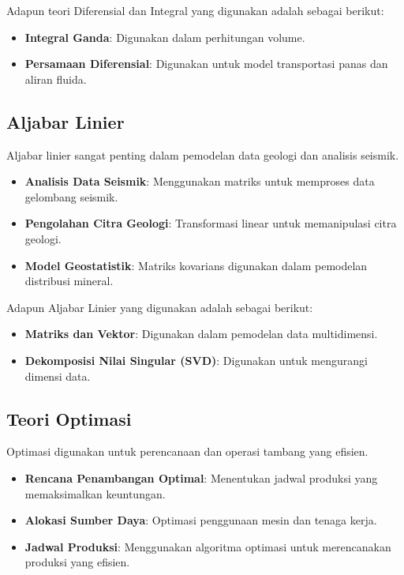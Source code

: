 \documentclass[
]{book}
\providecommand{\tightlist}{%
  \setlength{\itemsep}{0pt}\setlength{\parskip}{0pt}}
\begin{document}
Adapun teori Diferensial dan Integral yang digunakan adalah sebagai berikut:

\begin{itemize}
\tightlist
\item
  \textbf{Integral Ganda}: Digunakan dalam perhitungan volume.
\item
  \textbf{Persamaan Diferensial}: Digunakan untuk model transportasi panas dan aliran fluida.
\end{itemize}

\subsection{Aljabar Linier}\label{aljabar-linier}

Aljabar linier sangat penting dalam pemodelan data geologi dan analisis seismik.

\begin{itemize}
\tightlist
\item
  \textbf{Analisis Data Seismik}: Menggunakan matriks untuk memproses data gelombang seismik.
\item
  \textbf{Pengolahan Citra Geologi}: Transformasi linear untuk memanipulasi citra geologi.
\item
  \textbf{Model Geostatistik}: Matriks kovarians digunakan dalam pemodelan distribusi mineral.
\end{itemize}

Adapun Aljabar Linier yang digunakan adalah sebagai berikut:

\begin{itemize}
\tightlist
\item
  \textbf{Matriks dan Vektor}: Digunakan dalam pemodelan data multidimensi.
\item
  \textbf{Dekomposisi Nilai Singular (SVD)}: Digunakan untuk mengurangi dimensi data.
\end{itemize}

\subsection{Teori Optimasi}\label{teori-optimasi}

Optimasi digunakan untuk perencanaan dan operasi tambang yang efisien.

\begin{itemize}
\tightlist
\item
  \textbf{Rencana Penambangan Optimal}: Menentukan jadwal produksi yang memaksimalkan keuntungan.
\item
  \textbf{Alokasi Sumber Daya}: Optimasi penggunaan mesin dan tenaga kerja.
\item
  \textbf{Jadwal Produksi}: Menggunakan algoritma optimasi untuk merencanakan produksi yang efisien.
\end{itemize}
\end{document}
